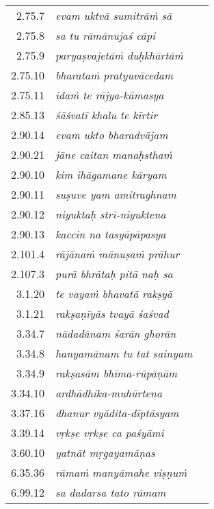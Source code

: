 {\begin{longtable}{rlc}
2.75.7 & {\sl evam uktvā sumitrāṁ sā} & \pageref{verse20}\\
2.75.8 & {\sl sa tu rāmānujaś cāpi} & \pageref{verse21}\\
2.75.9 & {\sl paryaṣvajetāṁ duḥkhārtāṁ} & \pageref{verse22}\\
2.75.10 & {\sl bharataṁ pratyuvācedam} & \pageref{verse23}\\
2.75.11 & {\sl idaṁ te rājya-kāmasya} & \pageref{verse24}\\
2.85.13 & {\sl śāśvatī khalu te kīrtir} & \pageref{verse25}\\
2.90.14 & {\sl evam ukto bharadvājam} & \pageref{verse26}\\
2.90.21 & {\sl jāne caitan manaḥsthaṁ} & \pageref{verse27}\\
2.90.10 & {\sl kim ihāgamane kāryam} & \pageref{verse28}\\
2.90.11 & {\sl suṣuve yam amitraghnam} & \pageref{verse29}\\
2.90.12 & {\sl niyuktaḥ strī-niyuktena} & \pageref{verse30}\\
2.90.13 & {\sl kaccin na tasyāpāpasya} & \pageref{verse31}\\
2.101.4 & {\sl rājānaṁ mānuṣaṁ prāhur} & \pageref{verse32}\\
2.107.3 & {\sl purā bhrātaḥ pitā naḥ sa} & \pageref{verse33}\\
3.1.20 & {\sl te vayaṁ bhavatā rakṣyā} & \pageref{verse34}\\
3.1.21 & {\sl rakṣaṇīyās tvayā śaśvad} & \pageref{verse35}\\
3.34.7 & {\sl nādadānam śarān ghorān} & \pageref{verse36}\\
3.34.8 & {\sl hanyamānam tu tat sainyam} & \pageref{verse37}\\
3.34.9 & {\sl rakṣasām bhīma-rūpāṇām} & \pageref{verse38}\\
3.34.10 & {\sl ardhādhika-muhūrtena} & \pageref{verse39}\\
3.37.16 & {\sl dhanur vyādita-dīptāsyam} & \pageref{verse40}\\
3.39.14 & {\sl vṛkṣe vṛkṣe ca paśyāmi} & \pageref{verse41}\\
3.60.10 & {\sl yatnāt mṛgayamāṇas} & \pageref{verse42}\\
6.35.36 & {\sl rāmaṁ manyāmahe viṣṇuṁ} & \pageref{verse43}\\
6.99.12 & {\sl sa dadarsa tato rāmam} & \pageref{verse44}
\end{longtable}}

